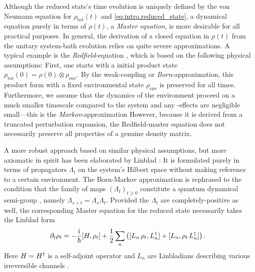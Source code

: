 Although the reduced state's time evolution is uniquely defined by the von Neumann equation for $\rho_\mathrm{tot}(t)$ and \autoref{eq:intro.reduced_state}, a dynamical equation purely in terms of $\rho(t)$, a \emph{Master equation}, is more desirable for all practical purposes.
In general, the derivation of a closed equation in $\rho(t)$ from the unitary system-bath evolution relies on quite severe approximations.
A typical example is the \emph{Redfield}-equation \cite{BrPe2002_open_quantum}, which is based on the following physical assumptions:
First, one starts with a initial product state $\rho_\mathrm{tot}(0) = \rho(0) \otimes \rho_\mathrm{env}$.
By the weak-coupling or \emph{Born}-approximation, this product form with a fixed environmental state $\rho_\mathrm{env}$ is preserved for all times.
Furthermore, we assume that the dynamics of the environment proceed on a much smaller timescale compared to the system and any -effects are negligible small---this is the \emph{Markov}-approximation
However, because it is derived from a truncated perturbation expansion, the Redfield-master equation does not necessarily preserve all properties of a genuine density matrix.


A more robust approach based on similar physical assumptions, but more axiomatic in spirit has been elaborated by Linblad \cite{Li76_generators_qdsg}:
It is formulated purely in terms of propagators $\Lambda_t$ on the system's Hilbert space without making reference to a certain environment.
The Born-Markov approximation is rephrased to the condition that the family of maps $(\Lambda_t)_{t\ge 0}$ constitute a quantum dynamical semi-group \cite{AlLe87_qds}, namely $\Lambda_{s+t} = \Lambda_s\Lambda_t$.
Provided the $\Lambda_t$ are completely-positive as well, the corresponding Master equation for the reduced state necessarily takes the Linblad form
\begin{equation}
  \partial_t \rho_t = - \frac{\mathrm{i}}{\hbar} [H, \rho_t] + \frac{1}{2}\sum_n \left( [L_n\,\rho_t, L^\dagger_n] + [L_n, \rho_t\,L^\dagger_n] \right).
  \label{eq:intro.linblad}
\end{equation}
Here $H = H^\dagger$ is a self-adjoint operator and $L_n$ are Linbladians describing various irreversible channels \cite{WiMi10_measurement}.

